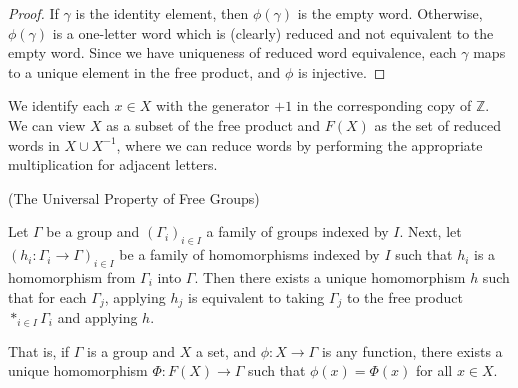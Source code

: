 
\begin{proof}
	If $\gamma$ is the identity element, then $\phi(\gamma)$ is the empty word. Otherwise, $\phi(\gamma)$ is a one-letter word which is (clearly) reduced and not equivalent to the empty word.  Since we have uniqueness of reduced word equivalence, each $\gamma$ maps to a unique element in the free product, and $\phi$ is injective.
\end{proof}


We identify each $x\in X$ with the generator $+1$ in the corresponding copy of $\mathbb{Z}$.  We can view $X$ as a subset of the free product and $F(X)$ as the set of reduced words in $X\cup X^{-1}$, where we can reduce words by performing the appropriate multiplication for adjacent letters.






\begin{theorem}(The Universal Property of Free Groups)
	
	Let $\Gamma$ be a group and $(\Gamma_i)_{i\in I}$ a family of groups indexed by $I$.  Next, let $(h_i:\Gamma_i\rightarrow\Gamma)_{i\in I}$ be a family of homomorphisms indexed by $I$ such that $h_i$ is a homomorphism from $\Gamma_i$ into $\Gamma$.  Then there exists a unique homomorphism $h$ such that for each $\Gamma_j$, applying $h_j$ is equivalent to taking $\Gamma_j$ to the free product $*_{i\in I}\Gamma_i$ and applying $h$.
	
	That is, if $\Gamma$ is a group and $X$ a set, and $\phi:X\rightarrow \Gamma$ is any function, there exists a unique homomorphism $\Phi:F(X)\rightarrow \Gamma$ such that $\phi(x)=\Phi(x)$ for all $x\in X$.
	
\end{theorem}

